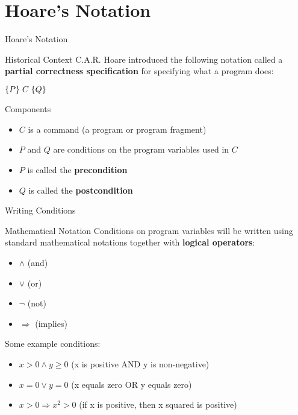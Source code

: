 \section{Hoare's Notation}

\begin{frame}{Hoare's Notation}
    \begin{block}{Historical Context}
        C.A.R. Hoare introduced the following notation called a \textbf{partial correctness specification} for specifying what a program does:
        \begin{center}
            \Large $\{P\}\; C\; \{Q\}$
        \end{center}
    \end{block}
    
    \begin{block}{Components}
        \begin{itemize}
            \item $C$ is a command (a program or program fragment)
            \item $P$ and $Q$ are conditions on the program variables used in $C$
            \item $P$ is called the \textbf{precondition}
            \item $Q$ is called the \textbf{postcondition}
        \end{itemize}
    \end{block}
\end{frame}

\begin{frame}{Writing Conditions}
    \begin{block}{Mathematical Notation}
        Conditions on program variables will be written using standard mathematical notations together with \textbf{logical operators}:
        \begin{itemize}
            \item $\wedge$ (and)
            \item $\vee$ (or)
            \item $\neg$ (not)
            \item $\Rightarrow$ (implies)
        \end{itemize}
    \end{block}
    
    \begin{example}
        Some example conditions:
        \begin{itemize}
            \item $x > 0 \wedge y \geq 0$ (x is positive AND y is non-negative)
            \item $x = 0 \vee y = 0$ (x equals zero OR y equals zero)
            \item $x > 0 \Rightarrow x^2 > 0$ (if x is positive, then x squared is positive)
        \end{itemize}
    \end{example}
\end{frame}

